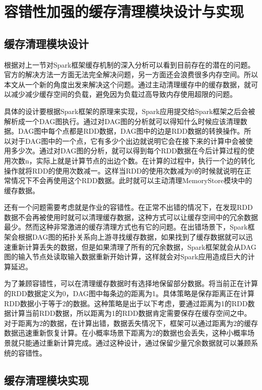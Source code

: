 \section{容错性加强的缓存清理模块设计与实现}

\subsection{缓存清理模块设计}

根据对上一节对Spark框架缓存机制的深入分析可以看到目前存在的潜在的问题。官方的解决方法一方面无法完全解决问题，另一方面还会浪费很多内存空间。所以本文从一个新的角度出发来解决这个问题。通过主动清理缓存中的缓存数据，就可以减少减少缓存空间的负载，避免因为负载过高导致内存使用超限的问题。

具体的设计要根据Spark框架的原理来实现，Spark应用提交给Spark框架之后会被解析成一个DAG图执行。通过对DAG图的分析就可以得知什么时候应该清理数据。DAG图中每个点都是RDD数据，DAG图中的边是RDD数据的转换操作。所以对于DAG图中的一个点，它有多少个出边就说明它会在接下来的计算中会被使用多少次。通过对DAG图的分析，就可以得到每个RDD数据在今后计算过程的使用次数n，实际上就是计算节点的出边个数。在计算的过程中，执行一个边的转化操作就将RDD的使用次数减一。这样当RDD的使用次数减为0的时候就说明在正常情况下不会再使用这个RDD数据。此时就可以主动清理MemoryStore模块中的缓存数据。

还有一个问题需要考虑就是作业的容错性。在正常不出错的情况下，在发现RDD数据不会再被使用时就可以清理缓存数据，这种方式可以让缓存空间中的冗余数据最少。然而这种非常激进的缓存清理方式也有它的问题。在出错场景下，Spark框架会根据DAG图的拓扑关系向上游寻找缓存数据，如果找到了缓存数据就可以迅速重新计算丢失的数据，但是如果清理了所有的冗余数据，Spark框架就会从DAG图的输入节点处读取输入数据重新开始计算，这样就会对Spark应用造成巨大的计算延迟。

为了兼顾容错性，可以在清理缓存数据时有选择地保留部分数据。将当前正在计算的RDD数据定义为0，DAG图中每条边的距离为1。具体策略是保存距离正在计算RDD数据小于等于2的数据。这种策略是出于以下考虑，要通过距离为1的RDD数据计算当前RDD数据，所以距离为1的RDD数据肯定需要保存在缓存空间之中。对于距离为2的数据，在计算出错，数据丢失情况下，框架可以通过距离为2的缓存数据迅速重新恢复计算。在小概率场景下距离为2的数据也会丢失，这种小概率场景就只能通过重新计算完成。通过这种设计，通过保留少量冗余数据就可以兼顾系统的容错性。

\subsection{缓存清理模块实现}

